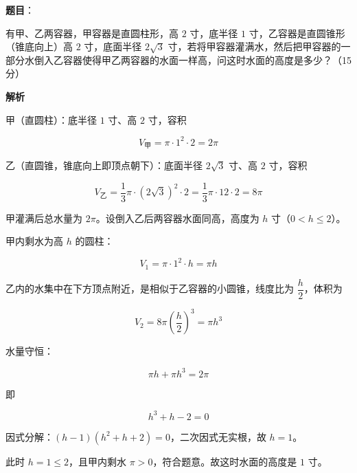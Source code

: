 \begin{answer}

\textbf{题目}：

有甲、乙两容器，甲容器是直圆柱形，高 $2$ 寸，底半径 $1$ 寸，乙容器是直圆锥形（锥底向上）高 $2$ 寸，底面半径 $2\sqrt{3}$ 寸，若将甲容器灌满水，然后把甲容器的一部分水倒入乙容器使得甲乙两容器的水面一样高，问这时水面的高度是多少？（15 分）

\textbf{解析}

甲（直圆柱）：底半径 $1$ 寸、高 $2$ 寸，容积

\nopagebreak[4]
\[
V_{\text{甲}}=\pi\cdot 1^{2}\cdot 2=2\pi
\]

乙（直圆锥，锥底向上即顶点朝下）：底面半径 $2\sqrt{3}$ 寸、高 $2$ 寸，容积

\nopagebreak[4]
\[
V_{\text{乙}}=\frac{1}{3}\pi\cdot(2\sqrt{3})^{2}\cdot 2=\frac{1}{3}\pi\cdot 12\cdot 2=8\pi
\]

甲灌满后总水量为 $2\pi$。设倒入乙后两容器水面同高，高度为 $h$ 寸（$0<h\le 2$）。

甲内剩水为高 $h$ 的圆柱：

\nopagebreak[4]
\[
V_{1}=\pi\cdot 1^{2}\cdot h=\pi h
\]

乙内的水集中在下方顶点附近，是相似于乙容器的小圆锥，线度比为 $\dfrac{h}{2}$，体积为

\nopagebreak[4]
\[
V_{2}=8\pi\left(\frac{h}{2}\right)^{3}=\pi h^{3}
\]

水量守恒：

\nopagebreak[4]
\[
\pi h+\pi h^{3}=2\pi
\]

即

\nopagebreak[4]
\[
h^{3}+h-2=0
\]

因式分解：$(h-1)(h^{2}+h+2)=0$，二次因式无实根，故 $h=1$。

此时 $h=1\le 2$，且甲内剩水 $\pi>0$，符合题意。故这时水面的高度是 $1$ 寸。


\end{answer}

